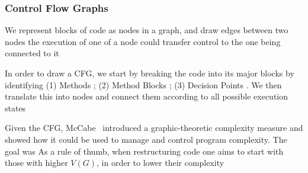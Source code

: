 \subsubsection{Control Flow Graphs}


\par{We represent blocks of code as nodes in a graph, and draw edges between two
nodes  the execution of one of a node could transfer control to the one
being connected to it}

\par{In order to draw a CFG, we start by breaking the code into its major blocks
by identifying (1) Methods ; (2) Method Blocks ; (3) Decision Points . We then
translate this into nodes and connect them according to all possible execution states}




\par{Given the CFG, McCabe~\cite{mccabe76} introduced a graphic-theoretic
complexity measure and showed how it could be used to manage and control program
complexity. The goal was  As a rule of
thumb, when restructuring code one aims to start with those with higher $V(G)$,
in order to lower their complexity}

